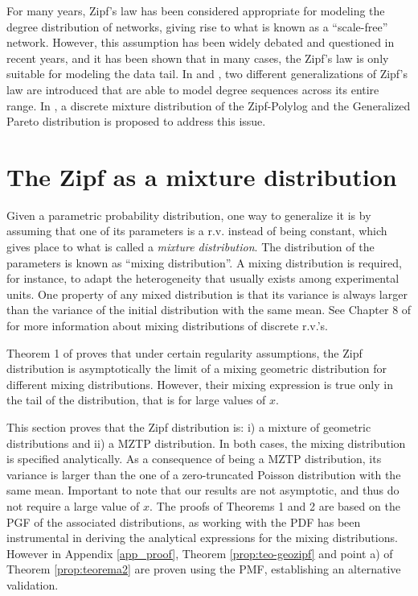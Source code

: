 \documentclass{article}
\begin{document}
For many years, Zipf's law has been considered appropriate for modeling the degree distribution of networks, giving rise to what is known as a ``scale-free'' network. However, this assumption has been widely debated and questioned in recent years, and it has been shown that in many cases, the Zipf's law is only suitable for modeling the data tail. In \cite{duarte2020zipf} and \cite{valero2022zipf}, two different generalizations of Zipf's law are introduced that are able to model degree sequences across its entire range. In \cite{lee2024degree}, a discrete mixture distribution of the Zipf-Polylog and the Generalized Pareto distribution is proposed to address this issue.

\section{The Zipf as a mixture distribution} \label{sec_zipfContrib}
Given a parametric probability distribution, one way to generalize it is by assuming that one of its parameters is a r.v. instead of being constant, which gives place to what is called a \textit{mixture distribution}. The distribution of the parameters is known as ``mixing distribution''. A mixing distribution is required, for instance, to adapt the heterogeneity that usually exists among experimental units. One property of any mixed distribution is that its variance is always larger than the variance of the initial distribution with the same mean. 
See Chapter 8 of \cite{johnson2005univariate} for more information about mixing distributions of discrete r.v.'s. 

Theorem 1 of \cite{hill1975stronger} proves that under certain regularity assumptions, the Zipf distribution is asymptotically the limit of a mixing geometric distribution for different mixing distributions. However, their mixing expression is true only in the tail of the distribution, that is for large values of $x$.

This section proves that the Zipf distribution is: i) a mixture of geometric distributions and ii) a MZTP distribution. In both cases, the mixing distribution is specified analytically. As a consequence of being a MZTP distribution, its variance is larger than the one of a zero-truncated Poisson distribution with the same mean. Important to note that our results are not asymptotic, and thus do not require a large value of $x$. The proofs of Theorems 1 and 2 are based on the PGF of the associated distributions, as working with the PDF has been instrumental in deriving the analytical expressions for the mixing distributions. However in Appendix \ref{app_proof}, Theorem \ref{prop:teo-geozipf} and point a) of Theorem \ref{prop:teorema2} are proven using the PMF, establishing an alternative validation.
\end{document}
